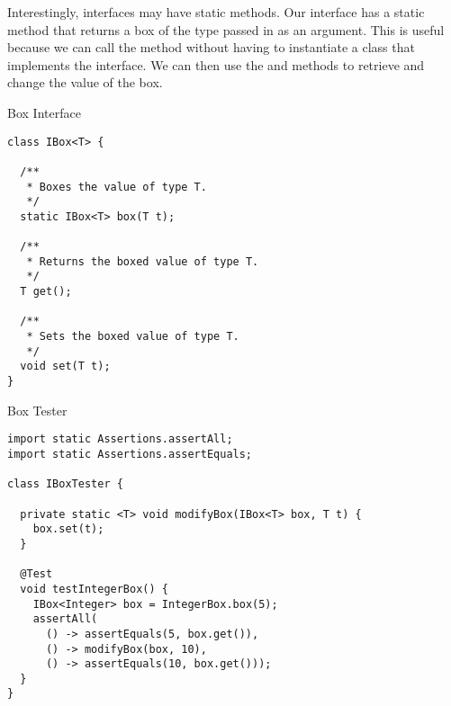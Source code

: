 

Interestingly, interfaces may have static methods. Our  interface has a static  method that returns a box of the type passed in as an argument. This is useful because we can call the  method without having to instantiate a class that implements the  interface. We can then use the  and  methods to retrieve and change the value of the box.

\begin{cl}[]{Box Interface}
\begin{lstlisting}[language=MyJava]
class IBox<T> {
  
  /**
   * Boxes the value of type T.
   */
  static IBox<T> box(T t);

  /**
   * Returns the boxed value of type T.
   */
  T get();

  /**
   * Sets the boxed value of type T.
   */
  void set(T t);
}
\end{lstlisting}
\end{cl}

\begin{cl}[]{Box Tester} 
\begin{lstlisting}[language=MyJava]
import static Assertions.assertAll;
import static Assertions.assertEquals;

class IBoxTester {

  private static <T> void modifyBox(IBox<T> box, T t) {
    box.set(t);
  }
  
  @Test
  void testIntegerBox() {
    IBox<Integer> box = IntegerBox.box(5);
    assertAll(
      () -> assertEquals(5, box.get()),
      () -> modifyBox(box, 10),
      () -> assertEquals(10, box.get()));
  }
}
\end{lstlisting}
\end{cl}

